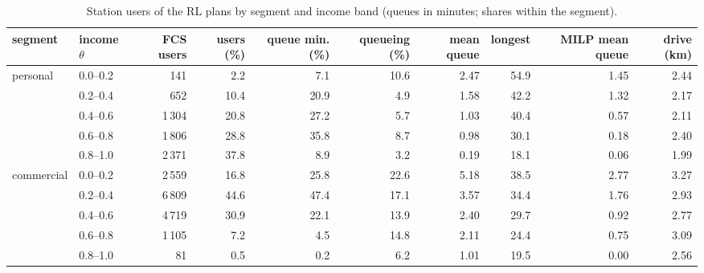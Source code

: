 \begin{table}[H]\centering
\footnotesize
\caption{Station users of the RL plans by segment and income band (queues in minutes; shares within the segment).}\label{tab:queues}
\begin{adjustbox}{max width=\textwidth}\begin{tabular}{llrrrrrrrr}\toprule
segment & income $\theta$ & FCS users & users (\%) & queue min. (\%) & queueing (\%) & mean queue & longest & MILP mean queue & drive (km) \\ \midrule
personal & 0.0--0.2 & 141 & 2.2 & 7.1 & 10.6 & 2.47 & 54.9 & 1.45 & 2.44 \\
 & 0.2--0.4 & 652 & 10.4 & 20.9 & 4.9 & 1.58 & 42.2 & 1.32 & 2.17 \\
 & 0.4--0.6 & 1\,304 & 20.8 & 27.2 & 5.7 & 1.03 & 40.4 & 0.57 & 2.11 \\
 & 0.6--0.8 & 1\,806 & 28.8 & 35.8 & 8.7 & 0.98 & 30.1 & 0.18 & 2.40 \\
 & 0.8--1.0 & 2\,371 & 37.8 & 8.9 & 3.2 & 0.19 & 18.1 & 0.06 & 1.99 \\
commercial & 0.0--0.2 & 2\,559 & 16.8 & 25.8 & 22.6 & 5.18 & 38.5 & 2.77 & 3.27 \\
 & 0.2--0.4 & 6\,809 & 44.6 & 47.4 & 17.1 & 3.57 & 34.4 & 1.76 & 2.93 \\
 & 0.4--0.6 & 4\,719 & 30.9 & 22.1 & 13.9 & 2.40 & 29.7 & 0.92 & 2.77 \\
 & 0.6--0.8 & 1\,105 & 7.2 & 4.5 & 14.8 & 2.11 & 24.4 & 0.75 & 3.09 \\
 & 0.8--1.0 & 81 & 0.5 & 0.2 & 6.2 & 1.01 & 19.5 & 0.00 & 2.56 \\
\bottomrule\end{tabular}\end{adjustbox}\end{table}
